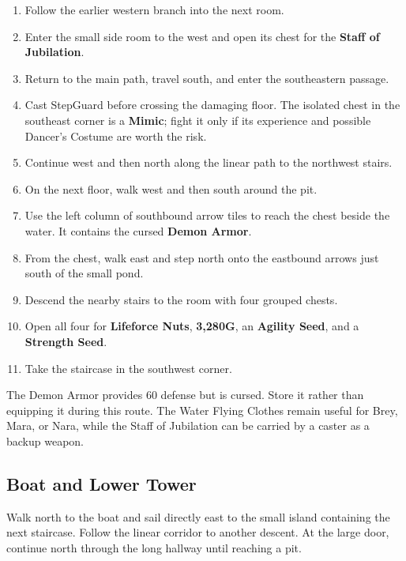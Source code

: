 \documentclass[
  american,
  10pt,
  letterpaper,
  oneside,
  open=any]{scrreprt}
\providecommand{\tightlist}{%
  \setlength{\itemsep}{0pt}\setlength{\parskip}{0pt}}
\begin{document}
\begin{enumerate}
\def\labelenumi{\arabic{enumi}.}
\tightlist
\item
  Follow the earlier western branch into the next room.
\item
  Enter the small side room to the west and open its chest for the
  \textbf{Staff of Jubilation}.
\item
  Return to the main path, travel south, and enter the southeastern
  passage.
\item
  Cast StepGuard before crossing the damaging floor. The isolated chest
  in the southeast corner is a \textbf{Mimic}; fight it only if its
  experience and possible Dancer's Costume are worth the risk.
\item
  Continue west and then north along the linear path to the northwest
  stairs.
\item
  On the next floor, walk west and then south around the pit.
\item
  Use the left column of southbound arrow tiles to reach the chest
  beside the water. It contains the cursed \textbf{Demon Armor}.
\item
  From the chest, walk east and step north onto the eastbound arrows
  just south of the small pond.
\item
  Descend the nearby stairs to the room with four grouped chests.
\item
  Open all four for \textbf{Lifeforce Nuts}, \textbf{3,280G}, an
  \textbf{Agility Seed}, and a \textbf{Strength Seed}.
\item
  Take the staircase in the southwest corner.
\end{enumerate}

The Demon Armor provides 60 defense but is cursed. Store it rather than
equipping it during this route. The Water Flying Clothes remain useful
for Brey, Mara, or Nara, while the Staff of Jubilation can be carried by
a caster as a backup weapon.

\subsection{Boat and Lower Tower}\label{boat-and-lower-tower}

Walk north to the boat and sail directly east to the small island
containing the next staircase. Follow the linear corridor to another
descent. At the large door, continue north through the long hallway
until reaching a pit.
\end{document}
